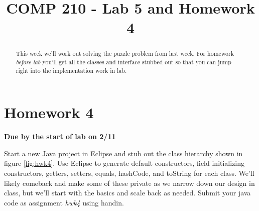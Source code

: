 \documentclass[nobib]{tufte-handout}
\title{COMP 210 - Lab 5 and Homework 4}
\begin{document}
\maketitle

\begin{abstract}
This week we'll work out solving the puzzle problem from last week. For homework \textit{before lab} you'll get all the classes and interface stubbed out so that you can jump right into the implementation work in lab.
\end{abstract}

\section{Homework 4}

\begin{center}
\textbf{Due by the start of lab on 2/11}
\end{center}

Start a new Java project in Eclipse and stub out the class hierarchy shown in figure \ref{fig:hwk4}. Use Eclipse to generate default constructors, field initializing constructors, getters, setters, equals, hashCode, and toString for each class.  We'll likely comeback and make some of these private as we narrow down our design in class, but we'll start with the basics and scale back as needed. Submit your java code as assignment \textit{hwk4} using handin.
\end{document}
